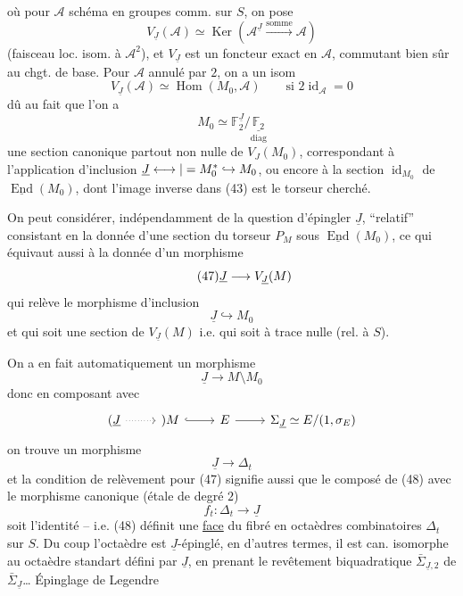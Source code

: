 où pour $\mathcal A$ schéma  en groupes comm. sur $S$, on pose
\[
\tag{44}V_{\underline J}(\mathcal A)\simeq\operatorname{Ker}(\mathcal A^{\underline J}\xrightarrow{\text{somme}}\mathcal A)
\]
(faisceau loc. isom. à $\mathcal A^2$), et $V_{\underline J}$ est un foncteur exact en $\mathcal A$, commutant bien sûr au chgt. de base. Pour $\mathcal A$ annulé par $2$, on a un isom
\[
\tag{45}V_{\underline J}(\mathcal A)\simeq\operatorname{Hom}(M_0,\mathcal A)\qquad\text{si }2\operatorname{id}_{\mathcal A}=0
\]
dû au fait que l'on a
\[
\tag{46}M_0\simeq\mathbb F_2^{\underline J}/\underset{\mathrm{diag}}{\underline{\mathbb F_2}}
\]
 une section  canonique partout non nulle de $V_J(M_0)$, correspondant à l'application d'inclusion $\underline J\longleftrightarrow|=M_0^*\hookrightarrow M_0$, ou encore à la section  $\operatorname{id}_{M_0}$ de $\underline{\operatorname{End}}(M_0)$, dont l'image inverse dans (43) est le torseur cherché.

On peut considérer, indépendamment de la question d'épingler $\underline J$,   ``relatif''  consistant en  la donnée d'une section du torseur $P_M$ sous $\underline{\operatorname{End}}(M_0)$, ce qui équivaut  aussi à la donnée d'un morphisme
\[
\tag{47}\underline J\longrightarrow V_{\underline J}(M)
\]
qui relève le morphisme d'inclusion
\[
\underline J\hookrightarrow M_0
\]
et qui soit une section de $V_{\underline J}(M)$ i.e. qui soit à trace nulle (rel. à $S$).

On a en fait automatiquement un morphisme
\[
\underline J\longrightarrow M\setminus M_0
\]
donc en composant avec 
\[
\diagram{\begin{tikzcd}[ampersand replacement=\&]
(\underline J\arrow[r,dotted]\& )M\arrow[r,hook]\&E\arrow[r]\&\Sigma_{\underline J}\simeq E/(1,\sigma_E)
\end{tikzcd}}
\]
on trouve un morphisme
\[
\tag{48}\underline J\longrightarrow\Delta_t
\]
et la condition de relèvement pour (47) signifie aussi que le composé de (48)
avec le morphisme canonique (étale de degré $2$)
\[
f_t:\Delta_t\longrightarrow\underline J
\]
soit l'identité -- i.e. (48) définit une \uline{face} du fibré en octaèdres combinatoires $\Delta_t$ sur $S$. Du coup l'octaèdre est $\underline J$-épinglé, en d'autres termes, il est can. isomorphe au  octaèdre standart défini par $\underline J$,  en prenant le revêtement biquadratique $\bar\Sigma_{\underline J,2}$ de $\bar\Sigma_{\underline J}$\ldots
{}
Épinglage de Legendre

